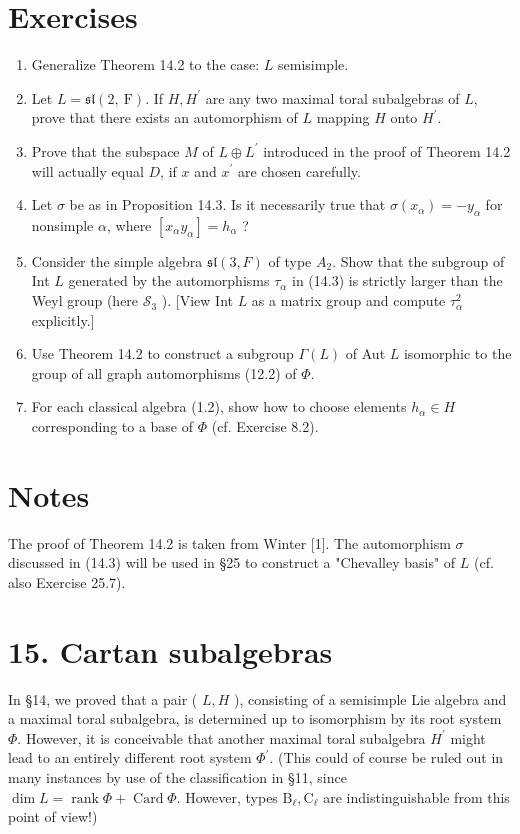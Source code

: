 \documentclass[10pt]{article}
\begin{document}
\section*{Exercises}
\begin{enumerate}
  \item Generalize Theorem 14.2 to the case: $L$ semisimple.
  \item Let $L=\mathfrak{s l}(2, \mathrm{~F})$. If $H, H^{\prime}$ are any two maximal toral subalgebras of $L$, prove that there exists an automorphism of $L$ mapping $H$ onto $H^{\prime}$.
  \item Prove that the subspace $M$ of $L \oplus L^{\prime}$ introduced in the proof of Theorem 14.2 will actually equal $D$, if $x$ and $x^{\prime}$ are chosen carefully.
  \item Let $\sigma$ be as in Proposition 14.3. Is it necessarily true that $\sigma\left(x_{\alpha}\right)=-y_{\alpha}$ for nonsimple $\alpha$, where $\left[x_{\alpha} y_{\alpha}\right]=h_{\alpha}$ ?
  \item Consider the simple algebra $\mathfrak{s l}(3, F)$ of type $A_{2}$. Show that the subgroup of Int $L$ generated by the automorphisms $\tau_{\alpha}$ in (14.3) is strictly larger than the Weyl group (here $\mathscr{S}_{3}$ ). [View Int $L$ as a matrix group and compute $\tau_{\alpha}^{2}$ explicitly.]
  \item Use Theorem 14.2 to construct a subgroup $\Gamma(L)$ of Aut $L$ isomorphic to the group of all graph automorphisms (12.2) of $\Phi$.
  \item For each classical algebra (1.2), show how to choose elements $h_{\alpha} \in H$ corresponding to a base of $\Phi$ (cf. Exercise 8.2).
\end{enumerate}

\section*{Notes}
The proof of Theorem 14.2 is taken from Winter [1]. The automorphism $\sigma$ discussed in (14.3) will be used in §25 to construct a "Chevalley basis" of $L$ (cf. also Exercise 25.7).

\section*{15. Cartan subalgebras}
In §14, we proved that a pair ( $L, H$ ), consisting of a semisimple Lie algebra and a maximal toral subalgebra, is determined up to isomorphism by its root system $\Phi$. However, it is conceivable that another maximal toral subalgebra $H^{\prime}$ might lead to an entirely different root system $\Phi^{\prime}$. (This could of course be ruled out in many instances by use of the classification in §11, since $\operatorname{dim} L=\operatorname{rank} \Phi+\operatorname{Card} \Phi$. However, types $\mathrm{B}_{\ell}, \mathrm{C}_{\ell}$ are indistinguishable from this point of view!)
\end{document}
